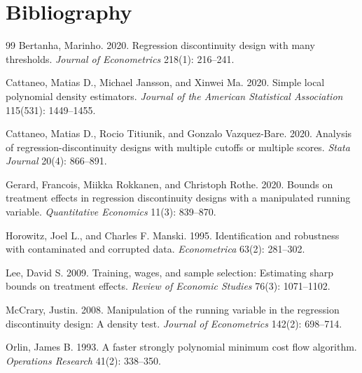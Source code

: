 \documentclass[11pt]{article}
\theoremstyle{definition}
\theoremstyle{plain}
\theoremstyle{remark}
\begin{document}
\section*{Bibliography}
\begin{thebibliography}{99}
Bertanha, Marinho.
2020.
Regression discontinuity design with many thresholds.
\emph{Journal of Econometrics} 218(1): 216--241.

Cattaneo, Matias D., Michael Jansson, and Xinwei Ma.
2020.
Simple local polynomial density estimators.
\emph{Journal of the American Statistical Association} 115(531): 1449--1455.

Cattaneo, Matias D., Rocio Titiunik, and Gonzalo Vazquez-Bare.
2020.
Analysis of regression-discontinuity designs with multiple cutoffs or multiple scores.
\emph{Stata Journal} 20(4): 866--891.

Gerard, Francois, Miikka Rokkanen, and Christoph Rothe.
2020.
Bounds on treatment effects in regression discontinuity designs with a manipulated running variable.
\emph{Quantitative Economics} 11(3): 839--870.

Horowitz, Joel L., and Charles F. Manski.
1995.
Identification and robustness with contaminated and corrupted data.
\emph{Econometrica} 63(2): 281--302.

Lee, David S.
2009.
Training, wages, and sample selection: Estimating sharp bounds on treatment effects.
\emph{Review of Economic Studies} 76(3): 1071--1102.

McCrary, Justin.
2008.
Manipulation of the running variable in the regression discontinuity design: A density test.
\emph{Journal of Econometrics} 142(2): 698--714.

Orlin, James B.
1993.
A faster strongly polynomial minimum cost flow algorithm.
\emph{Operations Research} 41(2): 338--350.
\end{thebibliography}
\end{document}
